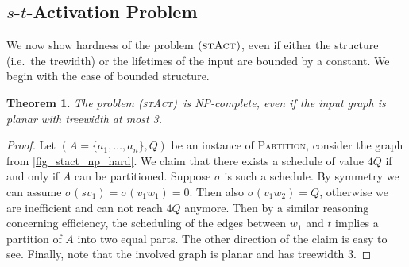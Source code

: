 \documentclass[10pt,a4paper]{article}
\newtheorem{theorem}{Theorem}[section]
\numberwithin{equation}{section}
\newcommand{\set}[1]{\{ #1 \}}
\newcommand{\fromto}[2]{\set{#1, \ldots, #2}}
\newcommand{\stact}{\textsc{(stAct)}}
\begin{document}
\subsection{$s$-$t$-Activation Problem}
We now show hardness of the problem $\stact$, even if either the structure (i.e.\ the trewidth) or the lifetimes of the input are bounded by a constant. We begin with the case of bounded structure.

\begin{theorem}
\label{thm_stact_np_hard}
The problem \stact\ is NP-complete, even if the input graph is planar with treewidth at most 3.
\end{theorem}

\begin{proof}
Let $(A = \fromto{a_1}{a_n}, Q)$ be an instance of \textsc{Partition}, consider the graph from \cref{fig_stact_np_hard}. We claim that there exists a schedule of value $4Q$ if and only if $A$ can be partitioned. Suppose $\sigma$ is such a schedule. By symmetry we can assume $\sigma(sv_1) = \sigma(v_1w_1) = 0$. Then also $\sigma(v_1w_2) = Q$, otherwise we are inefficient and can not reach $4Q$ anymore. Then by a similar reasoning concerning efficiency, the scheduling of the edges between $w_1$ and $t$ implies a partition of $A$ into two equal parts. The other direction of the claim is easy to see. Finally, note that the involved graph is planar and has treewidth 3.
\end{proof}
\end{document}
